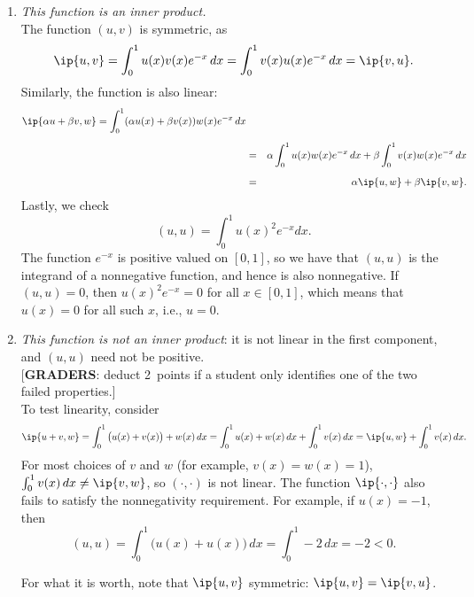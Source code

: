 {\begin{solution}
\begin{enumerate}
\item \emph{This function is an inner product.}\\
     The function $(u,v)$ is symmetric, as 
     \[ \ip{u,v} = \int_0^1 u(x) v(x) e^{-x}\, d x
                 =  \int_0^1 v(x) u(x) e^{-x} \, d x = \ip{v,u}.\]
      Similarly, the function is also linear:
     \begin{eqnarray*}
      \ip{\alpha u + \beta v, w} = \int_0^1 (\alpha u(x) + \beta v(x)) w(x) e^{-x}\, d x \\[0.5em]
                 &=&  \alpha \int_0^1 u(x)w(x) e^{-x}\, dx
                   +  \beta \int_0^1 v(x)w(x) e^{-x}\, dx \\[0.5em]
                 &=& \alpha \ip{u,w} + \beta \ip{v,w}.
     \end{eqnarray*}
      Lastly, we check
          \[ (u,u) = \int_0^1 u(x)^2 e^{-x} d x.\]
      The function $e^{-x}$ is positive valued on $[0,1]$, so we have 
      that $(u,u)$ is the integrand of a nonnegative function, and hence
      is also nonnegative.  If $(u,u) = 0$, then $u(x)^2 e^{-x} = 0$ for all $x\in[0,1]$,
      which means that $u(x)=0$ for all such $x$, i.e., $u=0$.
     
\item \emph{This function is not an inner product}: 
      it is not linear in the first component, and $(u,u)$ need not be positive.\\
      {[\textbf{GRADERS}: deduct 2~points if a student only identifies
        one of the two failed properties.]}\\
       To test linearity, consider 
         \[ \ip{u + v, w} 
                = \int_0^1 \big(u(x)+v(x)\big) + w(x) \,dx 
                = \int_0^1 u(x) + w(x) \,dx 
                   + \int_0^1 v(x)\,dx
                = \ip{u,w} + \int_0^1 v(x)\,dx.\]
        For most choices of $v$ and $w$ (for example, $v(x)=w(x)=1$), 
        $\int_0^1 v(x) \,dx \ne \ip{v,w}$, so $(\cdot,\cdot)$ is not linear.
      The function $\ip{\cdot,\cdot}$ also fails to satisfy the nonnegativity requirement.
       For example, if $u(x) = -1$,  then
         \[ (u,u) = \int_0^1 \big(u(x)+ u(x)\big) \, dx = \int_0^1 -2\, dx = -2 < 0.\]

       For what it is worth, note that $\ip{u,v}$ symmetric: $\ip{u,v}=\ip{v,u}$.
      
\end{enumerate}
\end{solution}}{}

